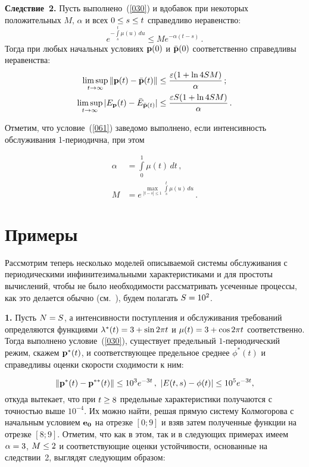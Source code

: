 {\begin{multicols}{2}
\smallskip

\noindent
\textbf{Следствие~2.} Пусть выполнено~(\ref{030}) и вдобавок
при некоторых положительных $M,\,\alpha$ и всех $0 \hm\le s \hm\le t$
справедливо неравенство:
\begin{equation}
e^{-\int\limits_s^t{\mu(u)\,du}} \le M e^{-\alpha (t-s)}\,.
\label{061}
\end{equation}
Тогда при любых начальных условиях ${\mathbf p}(0)$ и $\bar{{\mathbf p}}(0)$
соответственно справедливы неравенства:
\begin{align*}
\limsup_{t \to \infty}  \|{\bf p}(t)- \bar{\bf p}(t)\| &\le
\frac{\varepsilon(1+\ln{4SM})}{\alpha}\,;
\\
\limsup_{t \to \infty}   |E_{\bf p}(t)- \bar{E}_{\bar{\bf p}(t)}|&\le
\displaystyle\frac{\displaystyle \varepsilon S(1+\ln{4SM})\mathstrut}{\displaystyle \alpha\mathstrut}\,.
\end{align*}

\smallskip

Отметим, что условие~(\ref{061}) заведомо выполнено, если
интенсивность обслуживания 1-пе\-рио\-дична, при этом

\noindent
\begin{align*}
\alpha &= \int\limits_0^1 \mu(t)\, dt\,,\\
M &= e^{\max_{|t-s|\le 1}\int\limits_s^t\mu(u)\,du}\,.
\end{align*}

\section{Примеры}

Рассмотрим теперь несколько моделей описываемой системы обслуживания
с периодическими инфинитезимальными характеристиками и для простоты
вычислений, чтобы не было необходимости рассматривать усеченные
процессы, как это делается обычно (см.~\cite{z14a, z06}), будем
полагать $S\hm=10^2$.

{\bf 1.} Пусть $N\hm=S$, а интенсивности поступления и обслуживания
требований определяются функциями $\lambda^*(t)\hm= 3\hm+\sin{2\pi t}$ и
$\mu(t)\hm=3\hm+\cos{2 \pi t}$ соответственно. Тогда выполнено условие~(\ref{030}),
существует предельный $1$-пе\-рио\-ди\-че\-ский режим, скажем
${\mathbf p}^*(t)$, и соответствующее предельное среднее $\phi^*(t)$ и
справедливы оценки скорости сходимости к ним:

\noindent
\begin{equation*}
\|{\mathbf p}^*(t)-{\mathbf p}^{**}(t)\| \le 10^3e^{-3t}\,, \
|E(t,s)-\phi(t)|\le 10^5e^{-3t},
\end{equation*}
откуда вытекает, что при $t \hm\ge 8$ предельные характеристики
получаются с точностью выше $10^{-4}$. Их можно найти, решая прямую
систему Колмогорова с начальным условием ${\bf e_0}$ на отрезке
$[0;9]$ и взяв затем полученные функции на отрезке $[8;9]$. Отметим,
что  как в этом, так и в следующих примерах имеем $\alpha \hm= 3$,
$M \hm\le 2$ и соответствующие оценки устойчивости, основанные на
следствии~2, выглядят следующим образом:


\end{multicols}}
